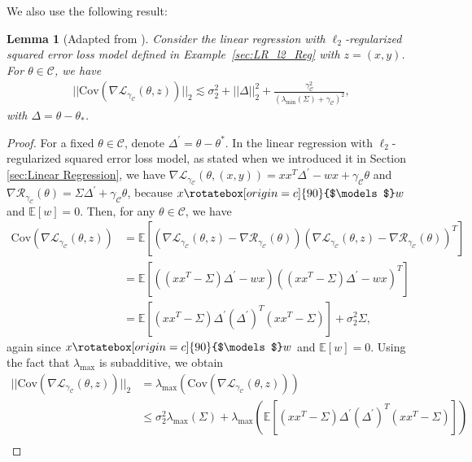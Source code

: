 \documentclass{article}
\newtheorem{lemma}{Lemma}
\newcommand{\indep}{\rotatebox[origin=c]{90}{$\models$}}
\begin{document}
We also use the following result:

\begin{lemma}[Adapted from \cite{RE}]
\label{lemma:cov_ri}
Consider the linear regression with $\ell_2$-regularized squared error loss model defined in Example~\ref{sec:LR_l2_Reg} with $z = (x, y)$. For $\theta \in \mathcal{C}$, we have
\begin{align*}
||\mathrm{\mathrm{Cov}}(\nabla \mathcal{L}_{\gamma_{\mathcal{C}}}(\theta, z))||_2 \lesssim \sigma_2^2 + ||\Delta||_2^2 + \frac{\gamma_{\mathcal{C}}^2}{(\lambda_{\min}(\Sigma) + \gamma_{\mathcal{C}})^2},
\end{align*}
with $\Delta = \theta - \theta_{*}$.
\end{lemma}

\begin{proof}
For a fixed $\theta \in \mathcal{C}$, denote $\Delta^{'} = \theta - \theta^{*}$. In the linear regression with $\ell_2$-regularized squared error loss model, as stated when we introduced it in Section \ref{sec:Linear Regression}, we have $\nabla \mathcal{L}_{\gamma_{\mathcal{C}}}(\theta, (x, y)) = xx^T\Delta^{'} - wx + \gamma_{\mathcal{C}}\theta$ and $\nabla\mathcal{R}_{\gamma_{\mathcal{C}}}(\theta) = \Sigma\Delta^{'} + \gamma_{\mathcal{C}}\theta$, because $x \indep w$ and $\mathbb{E}[w] = 0$. Then, for any $\theta \in \mathcal{C}$, we have
\begin{align*}
\mathrm{\mathrm{Cov}}(\nabla \mathcal{L}_{\gamma_{\mathcal{C}}}(\theta, z)) &= \mathbb{E}\left[(\nabla \mathcal{L}_{\gamma_{\mathcal{C}}}(\theta, z) - \nabla\mathcal{R}_{\gamma_{\mathcal{C}}}(\theta))(\nabla \mathcal{L}_{\gamma_{\mathcal{C}}}(\theta, z) - \nabla\mathcal{R}_{\gamma_{\mathcal{C}}}(\theta))^T\right]\\
&= \mathbb{E}[((xx^T - \Sigma)\Delta^{'} - wx)((xx^T - \Sigma)\Delta^{'} - wx)^T] \\
%
& = \mathbb{E}[(xx^T - \Sigma)\Delta^{'}(\Delta^{'})^T(xx^T - \Sigma)] + \sigma_2^2\Sigma,
\end{align*}
again since $x \indep w$ and $\mathbb{E}[w] = 0$. Using the fact that $\lambda_{\max}$ is subadditive, we obtain
\begin{align*}
||\mathrm{\mathrm{Cov}}(\nabla \mathcal{L}_{\gamma_{\mathcal{C}}}(\theta, z))||_2 &= \lambda_{\max}(\mathrm{\mathrm{Cov}}(\nabla \mathcal{L}_{\gamma_{\mathcal{C}}}(\theta, z))) \\
%
& \leq \sigma_2^2\lambda_{\max}(\Sigma) + \lambda_{\max}\left(\mathbb{E}[(xx^T - \Sigma)\Delta^{'}(\Delta^{'})^T(xx^T - \Sigma)]\right)\\

\end{align*}
\end{proof}
\end{document}
